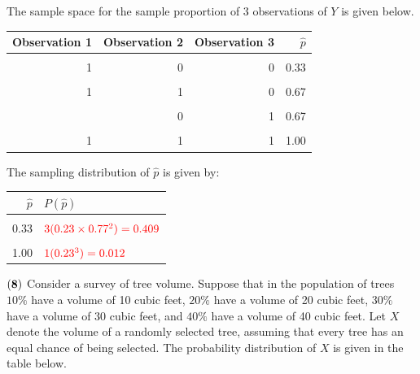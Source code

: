 \documentclass[
]{article}
\begin{document}
{The sample space for the sample proportion of 3 observations of \(Y\)
is given below.}

\begin{table}[H]
\centering\centering
\begin{tabular}{rrrr}
\toprule
Observation 1 & Observation 2 & Observation 3 & $\hat{p}$\\
\midrule
\cellcolor{gray!10}{0} & \cellcolor{gray!10}{0} & \cellcolor{gray!10}{0} & \cellcolor{gray!10}{0.00}\\
1 & 0 & 0 & 0.33\\
\cellcolor{gray!10}{0} & \cellcolor{gray!10}{1} & \cellcolor{gray!10}{0} & \cellcolor{gray!10}{0.33}\\
1 & 1 & 0 & 0.67\\
\cellcolor{gray!10}{0} & \cellcolor{gray!10}{0} & \cellcolor{gray!10}{1} & \cellcolor{gray!10}{0.33}\\
\addlinespace
1 & 0 & 1 & 0.67\\
\cellcolor{gray!10}{0} & \cellcolor{gray!10}{1} & \cellcolor{gray!10}{1} & \cellcolor{gray!10}{0.67}\\
1 & 1 & 1 & 1.00\\
\bottomrule
\end{tabular}
\end{table}

{The sampling distribution of \(\hat{p}\) is given by:}

\begin{table}[H]
\centering\centering
\begin{tabular}{rl}
\toprule
$\hat{p}$ & $P(\hat{p})$\\
\midrule
\cellcolor{gray!10}{0.00} & \cellcolor{gray!10}{$\color{red}{1(0.77^3)=0.457}$}\\
0.33 & $\color{red}{3(0.23 \times 0.77^2)=0.409}$\\
\cellcolor{gray!10}{0.67} & \cellcolor{gray!10}{$\color{red}{3(0.23^2\times 0.77)=0.122}$}\\
1.00 & $\color{red}{1(0.23^3)=0.012}$\\
\bottomrule
\end{tabular}
\end{table}

\(\bf (8)\) Consider a survey of tree volume. Suppose that in the
population of trees \(10\%\) have a volume of 10 cubic feet, \(20\%\)
have a volume of 20 cubic feet, \(30\%\) have a volume of 30 cubic feet,
and \(40\%\) have a volume of 40 cubic feet. Let \(X\) denote the volume
of a randomly selected tree, assuming that every tree has an equal
chance of being selected. The probability distribution of \(X\) is given
in the table below.
\end{document}
